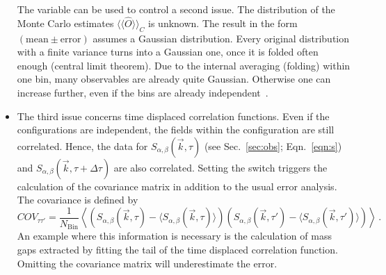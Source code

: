 \documentclass{SciPost}
\begin{document}
\begin{itemize}
The  variable can be used to control a second issue. The distribution of the Monte Carlo estimates $\langle\langle\hat{O}\rangle\rangle_C$ is unknown. The result in the form $(\mathrm{mean}\pm \mathrm{error})$ assumes a Gaussian distribution. Every original distribution with a finite variance turns into a Gaussian one, once it is folded often enough (central limit theorem). Due to the internal averaging (folding) within one bin, many observables are already quite Gaussian. Otherwise one can increase  further, even if the bins are already independent~\cite{Bercx17}.
	\item The third issue concerns time displaced correlation functions. Even if the configurations are independent, the fields within the configuration are still correlated. Hence, the data for $S_{\alpha,\beta}(\vec{k},\tau)$ (see Sec.~\ref{sec:obs}; Eqn.~\ref{eqn:s}) and $S_{\alpha,\beta}(\vec{k},\tau+\Delta\tau)$ are also correlated. Setting the switch  triggers the calculation of the covariance matrix in addition to the usual error analysis. The covariance is defined by
	\begin{equation}
		COV_{\tau \tau'}=\frac{1}{N_{\text{Bin}}}\left\langle\left(S_{\alpha,\beta}(\vec{k},\tau)-\langle S_{\alpha,\beta}(\vec{k},\tau)\rangle\right)\left(S_{\alpha,\beta}(\vec{k},\tau')-\langle S_{\alpha,\beta}(\vec{k},\tau')\rangle\right)\right\rangle\,.
	\end{equation}
An example where this information is necessary is the  calculation of mass gaps extracted by fitting the  tail  of the time displaced correlation function.  Omitting  the covariance matrix will  underestimate the  error.
\end{itemize}


%
\end{document}
